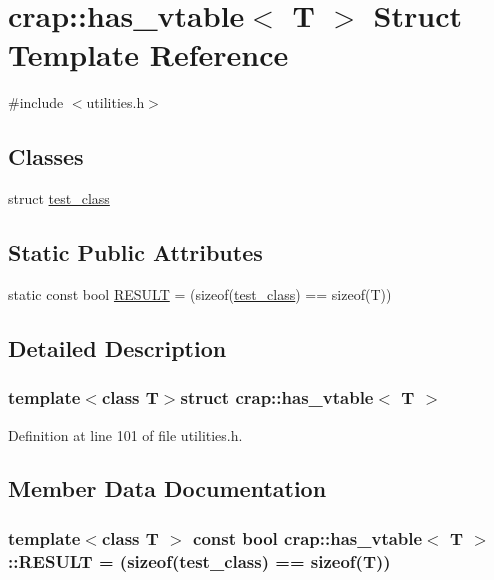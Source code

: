 \hypertarget{structcrap_1_1has__vtable}{\section{crap\+:\+:has\+\_\+vtable$<$ T $>$ Struct Template Reference}
\label{structcrap_1_1has__vtable}
}


{\ttfamily \#include $<$utilities.\+h$>$}

\subsection*{Classes}
\begin{DoxyCompactItemize}
\item 
struct \hyperlink{structcrap_1_1has__vtable_1_1test__class}{test\+\_\+class}
\end{DoxyCompactItemize}
\subsection*{Static Public Attributes}
\begin{DoxyCompactItemize}
\item 
static const bool \hyperlink{structcrap_1_1has__vtable_a020726388c42488ee23dc65f8e1b4b83}{R\+E\+S\+U\+L\+T} = (sizeof(\hyperlink{structcrap_1_1has__vtable_1_1test__class}{test\+\_\+class}) == sizeof(T))
\end{DoxyCompactItemize}


\subsection{Detailed Description}
\subsubsection*{template$<$class T$>$struct crap\+::has\+\_\+vtable$<$ T $>$}



Definition at line 101 of file utilities.\+h.



\subsection{Member Data Documentation}
\hypertarget{structcrap_1_1has__vtable_a020726388c42488ee23dc65f8e1b4b83}{
\subsubsection[{R\+E\+S\+U\+L\+T}]{\setlength{\rightskip}{0pt plus 5cm}template$<$class T $>$ const bool {\bf crap\+::has\+\_\+vtable}$<$ T $>$\+::R\+E\+S\+U\+L\+T = (sizeof({\bf test\+\_\+class}) == sizeof(T))\hspace{0.3cm}{\ttfamily [static]}}}\label{structcrap_1_1has__vtable_a020726388c42488ee23dc65f8e1b4b83}



